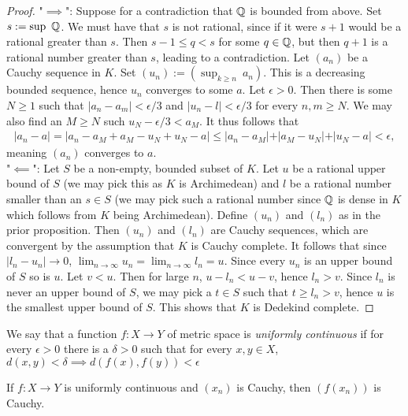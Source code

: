     \begin{proof}
        "$\implies$": Suppose for a contradiction that $\mathbb{Q}$ is bounded from above. Set $s := \sup\ \Q$. We must have that $s$ is not rational, since if it were $s+1$ would be a rational greater than $s$.  Then $s-1\leq q < s$ for some $q\in\mathbb{Q}$, but then $q+1$ is a rational number greater than $s$, leading to a contradiction. Let $(a_n)$ be a Cauchy sequence in $K$. Set $(u_n):=(\sup_{k\geq n} \ a_n)$. This is a decreasing bounded sequence, hence $u_n$ converges to some $a$. Let $\epsilon >0$. Then there is some $N\geq 1$ such that $\vert a_n -a_m\vert < \epsilon/3 $ and $\vert u_n-l\vert< \epsilon/3$ for every $n,m\geq N$. We may also find an $M\geq N$ such $u_N-\epsilon/3 <a_M$. It thus follows that
        \begin{align*}
            \vert a_n-a\vert = \vert a_n -a_M +a_M- u_N+u_N-a\vert\leq \vert a_n-a_M\vert + \vert a_M-u_N\vert + \vert u_N-a\vert < \epsilon, 
        \end{align*}
        meaning $(a_n)$ converges to $a$.\\
        "$\impliedby$": Let $S$ be a non-empty, bounded subset of $K$. Let $u$ be a rational upper bound of $S$ (we may pick this as $K$ is Archimedean) and $l$ be a rational number smaller than an $s\in S$ (we may pick such a rational number since $\mathbb{Q}$ is dense in $K$ which follows from $K$ being Archimedean). Define $(u_n)$ and $(l_n)$ as in the prior proposition. Then $(u_n)$ and $(l_n)$ are Cauchy sequences, which are convergent by the assumption that $K$ is Cauchy complete. It follows that since $\vert l_n-u_n\vert \to 0$, $\lim_{n\to \infty} u_n = \lim_{n\to \infty} l_n = u$. Since every $u_n$ is an upper bound of $S$ so is $u$. Let $v<u$. Then for large $n$, $u-l_n < u-v$, hence $l_n>v$. Since $l_n$ is never an upper bound of $S$, we may pick a $t\in S$ such that $t\geq l_n> v$, hence $u$ is the smallest upper bound of $S$. This shows that $K$ is Dedekind complete.
    \end{proof}
    \begin{definition}
        We say that a function $f: X\rightarrow Y$ of metric space is \textit{uniformly continuous} if for every $\epsilon>0$ there is a $\delta >0$ such that for every $x,y\in X$, $d(x,y)<\delta \implies d(f(x),f(y))<\epsilon$
    \end{definition}
    \begin{lemma}
        If $f : X\rightarrow Y$ is uniformly continuous and $(x_n)$ is Cauchy, then $(f(x_n))$ is Cauchy.
    \end{lemma}
